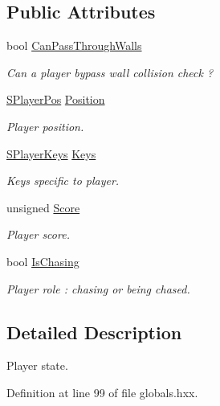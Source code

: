 \subsection*{Public Attributes}
\begin{DoxyCompactItemize}
\item 
bool \hyperlink{struct_chase_game_1_1_s_player_state_acd7030969c414605901e551171078bb1}{Can\-Pass\-Through\-Walls}
\begin{DoxyCompactList}\small\item\em Can a player bypass wall collision check ? \end{DoxyCompactList}\item 
\hyperlink{struct_chase_game_1_1_s_player_pos}{S\-Player\-Pos} \hyperlink{struct_chase_game_1_1_s_player_state_a0a68b95a4255f2a543675f88b00847b4}{Position}
\begin{DoxyCompactList}\small\item\em Player position. \end{DoxyCompactList}\item 
\hyperlink{struct_chase_game_1_1_s_player_keys}{S\-Player\-Keys} \hyperlink{struct_chase_game_1_1_s_player_state_a3fc9ce0322ed28ff9c401983d91c69f2}{Keys}
\begin{DoxyCompactList}\small\item\em Keys specific to player. \end{DoxyCompactList}\item 
unsigned \hyperlink{struct_chase_game_1_1_s_player_state_a268594c795a70cf1eb9fe6061bfa57d0}{Score}
\begin{DoxyCompactList}\small\item\em Player score. \end{DoxyCompactList}\item 
bool \hyperlink{struct_chase_game_1_1_s_player_state_a2574de666d4744daefd7824b1c3c809f}{Is\-Chasing}
\begin{DoxyCompactList}\small\item\em Player role \-: chasing or being chased. \end{DoxyCompactList}\end{DoxyCompactItemize}


\subsection{Detailed Description}
Player state. 

Definition at line 99 of file globals.\-hxx.



